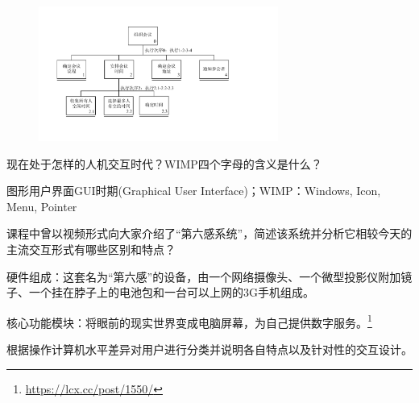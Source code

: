 \begin{solution}
\begin{figure}[H]
    \vspace{-0.5em}
	\centering
	\includegraphics[width=0.7\textwidth]{3.pdf}
    \vspace{-1em}
\end{figure}
\end{solution}



\begin{problem}[2016]
现在处于怎样的人机交互时代？WIMP四个字母的含义是什么？
\end{problem}

\begin{solution}
图形用户界面GUI时期(Graphical User Interface)；WIMP：Windows, Icon, Menu, Pointer
\end{solution}



\begin{problem}[2016、2021]
课程中曾以视频形式向大家介绍了“第六感系统”，简述该系统并分析它相较今天的主流交互形式有哪些区别和特点？
\end{problem}

\begin{solution}
硬件组成：这套名为“第六感”的设备，由一个网络摄像头、一个微型投影仪附加镜子、一个挂在脖子上的电池包和一台可以上网的3G手机组成。

核心功能模块：将眼前的现实世界变成电脑屏幕，为自己提供数字服务。\footnote{\url{https://lcx.cc/post/1550/}}
\end{solution}



\begin{problem}[2016]
根据操作计算机水平差异对用户进行分类并说明各自特点以及针对性的交互设计。
\end{problem}

